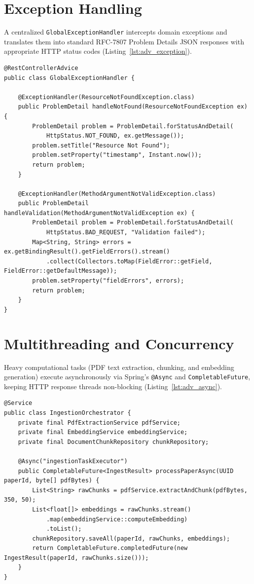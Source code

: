 \documentclass[11pt,a4paper,titlepage]{report}
\begin{document}
\section{Exception Handling}
A centralized \texttt{GlobalExceptionHandler} intercepts domain exceptions and translates them into standard RFC-7807 Problem Details JSON responses with appropriate HTTP status codes (Listing~\ref{lst:adv_exception}).

\begin{lstlisting}[caption={Global Exception Handler Producing RFC-7807 Problem Details}, label={lst:adv_exception}]
@RestControllerAdvice
public class GlobalExceptionHandler {

    @ExceptionHandler(ResourceNotFoundException.class)
    public ProblemDetail handleNotFound(ResourceNotFoundException ex) {
        ProblemDetail problem = ProblemDetail.forStatusAndDetail(
            HttpStatus.NOT_FOUND, ex.getMessage());
        problem.setTitle("Resource Not Found");
        problem.setProperty("timestamp", Instant.now());
        return problem;
    }

    @ExceptionHandler(MethodArgumentNotValidException.class)
    public ProblemDetail handleValidation(MethodArgumentNotValidException ex) {
        ProblemDetail problem = ProblemDetail.forStatusAndDetail(
            HttpStatus.BAD_REQUEST, "Validation failed");
        Map<String, String> errors = ex.getBindingResult().getFieldErrors().stream()
            .collect(Collectors.toMap(FieldError::getField, FieldError::getDefaultMessage));
        problem.setProperty("fieldErrors", errors);
        return problem;
    }
}
\end{lstlisting}

\section{Multithreading and Concurrency}
Heavy computational tasks (PDF text extraction, chunking, and embedding generation) execute asynchronously via Spring's \texttt{@Async} and \texttt{CompletableFuture}, keeping HTTP response threads non-blocking (Listing~\ref{lst:adv_async}).

\begin{lstlisting}[caption={Asynchronous Processing Pipeline with CompletableFuture}, label={lst:adv_async}]
@Service
public class IngestionOrchestrator {
    private final PdfExtractionService pdfService;
    private final EmbeddingService embeddingService;
    private final DocumentChunkRepository chunkRepository;

    @Async("ingestionTaskExecutor")
    public CompletableFuture<IngestResult> processPaperAsync(UUID paperId, byte[] pdfBytes) {
        List<String> rawChunks = pdfService.extractAndChunk(pdfBytes, 350, 50);
        List<float[]> embeddings = rawChunks.stream()
            .map(embeddingService::computeEmbedding)
            .toList();
        chunkRepository.saveAll(paperId, rawChunks, embeddings);
        return CompletableFuture.completedFuture(new IngestResult(paperId, rawChunks.size()));
    }
}
\end{lstlisting}
\end{document}
